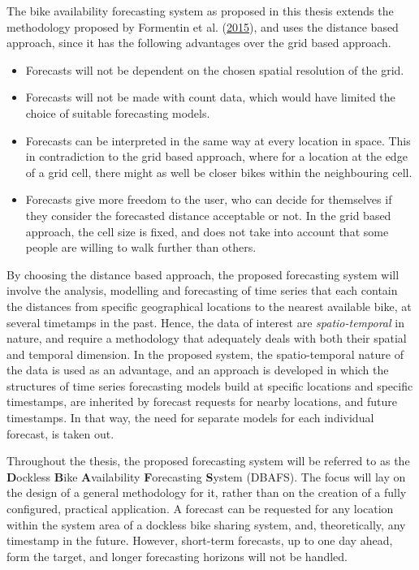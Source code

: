 \documentclass[12pt,oneside]{reedthesis}
\providecommand{\tightlist}{%
  \setlength{\itemsep}{0pt}\setlength{\parskip}{0pt}}
\begin{document}
The bike availability forecasting system as proposed in this thesis
extends the methodology proposed by Formentin et al.
(\protect\hyperlink{ref-formentin2015}{2015}), and uses the distance
based approach, since it has the following advantages over the grid
based approach.
\begin{itemize}
\tightlist
\item
  Forecasts will not be dependent on the chosen spatial resolution of
  the grid.
\item
  Forecasts will not be made with count data, which would have limited
  the choice of suitable forecasting models.
\item
  Forecasts can be interpreted in the same way at every location in
  space. This in contradiction to the grid based approach, where for a
  location at the edge of a grid cell, there might as well be closer
  bikes within the neighbouring cell.
\item
  Forecasts give more freedom to the user, who can decide for themselves
  if they consider the forecasted distance acceptable or not. In the
  grid based approach, the cell size is fixed, and does not take into
  account that some people are willing to walk further than others.
\end{itemize}
By choosing the distance based approach, the proposed forecasting system
will involve the analysis, modelling and forecasting of time series that
each contain the distances from specific geographical locations to the
nearest available bike, at several timetamps in the past. Hence, the
data of interest are \emph{spatio-temporal} in nature, and require a
methodology that adequately deals with both their spatial and temporal
dimension. In the proposed system, the spatio-temporal nature of the
data is used as an advantage, and an approach is developed in which the
structures of time series forecasting models build at specific locations
and specific timestamps, are inherited by forecast requests for nearby
locations, and future timestamps. In that way, the need for separate
models for each individual forecast, is taken out.

Throughout the thesis, the proposed forecasting system will be referred
to as the \textbf{D}ockless \textbf{B}ike \textbf{A}vailability
\textbf{F}orecasting \textbf{S}ystem (DBAFS). The focus will lay on the
design of a general methodology for it, rather than on the creation of a
fully configured, practical application. A forecast can be requested for
any location within the system area of a dockless bike sharing system,
and, theoretically, any timestamp in the future. However, short-term
forecasts, up to one day ahead, form the target, and longer forecasting
horizons will not be handled.
\end{document}
